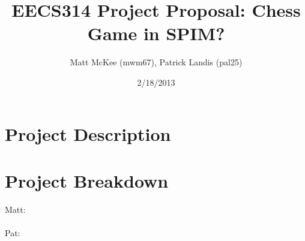 \documentclass[]{article}
\title{EECS314 Project Proposal: Chess Game in SPIM?}
\author{Matt McKee (mwm67), Patrick Landis (pal25)}
\date{2/18/2013}
\begin{document}
\maketitle

\section*{Project Description}

\section*{Project Breakdown}
Matt: \\
\\
Pat:
\end{document}
